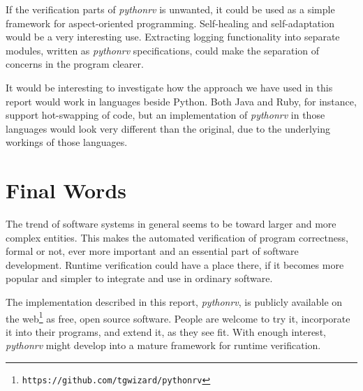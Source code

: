 If the verification parts of \textit{pythonrv} is unwanted, it could be used as
a simple framework for aspect-oriented programming. Self-healing and
self-adaptation would be a very interesting use. Extracting logging
functionality into separate modules, written as \textit{pythonrv}
specifications, could make the separation of concerns in the program clearer.

It would be interesting to investigate how the approach we have used in this
report would work in languages beside Python. Both Java and Ruby, for instance,
support hot-swapping of code, but an implementation of \textit{pythonrv} in
those languages would look very different than the original, due to the
underlying workings of those languages.


\section{Final Words}

The trend of software systems in general seems to be toward larger and more
complex entities. This makes the automated verification of program
correctness, formal or not, ever more important and an essential part of
software development. Runtime verification could have a place there, if it
becomes more popular and simpler to integrate and use in ordinary software.

The implementation described in this report, \textit{pythonrv}, is publicly
available on the web\footnote{\texttt{https://github.com/tgwizard/pythonrv}} as
free, open source software. People are welcome to try it, incorporate it into
their programs, and extend it, as they see fit. With enough interest,
\textit{pythonrv} might develop into a mature framework for runtime
verification.

